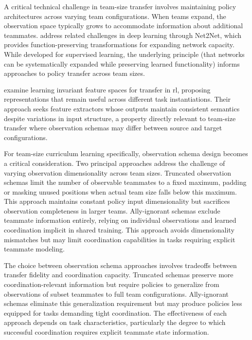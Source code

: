A critical technical challenge in team-size transfer involves 
maintaining policy architectures across varying team configurations. 
When teams expand, the observation space typically grows to accommodate 
information about additional teammates. 
\cite{chen2016} address related challenges in deep learning through Net2Net, 
which provides function-preserving transformations for expanding network capacity. 
While developed for supervised learning, the underlying principle
(that networks can be systematically expanded while preserving learned functionality)
informs approaches to policy transfer across team sizes.

\cite{gupta2017a} examine learning invariant feature spaces for transfer in \gls{rl}, 
proposing representations that remain useful across different task instantiations. 
Their approach seeks feature extractors whose outputs maintain consistent 
semantics despite variations in input structure, a property directly relevant 
to team-size transfer where observation schemas may differ between source and 
target configurations.

For team-size curriculum learning specifically, observation schema design 
becomes a critical consideration. Two principal approaches address the 
challenge of varying observation dimensionality across team sizes. 
Truncated observation schemas limit the number of observable teammates 
to a fixed maximum, padding or masking unused positions when actual 
team size falls below this maximum. This approach maintains constant 
policy input dimensionality but sacrifices observation completeness 
in larger teams. Ally-ignorant schemas exclude teammate information entirely, 
relying on individual observations and learned coordination implicit in shared training. 
This approach avoids dimensionality mismatches but may limit coordination 
capabilities in tasks requiring explicit teammate modeling.

The choice between observation schema approaches involves tradeoffs 
between transfer fidelity and coordination capacity. Truncated schemas 
preserve more coordination-relevant information but require policies to 
generalize from observations of subset teammates to full team configurations. 
Ally-ignorant schemas eliminate this generalization requirement but may 
produce policies less equipped for tasks demanding tight coordination. 
The effectiveness of each approach depends on task characteristics, 
particularly the degree to which successful coordination requires 
explicit teammate state information.

